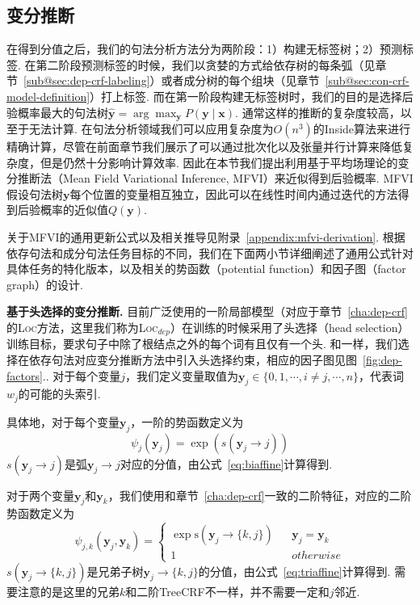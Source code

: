 \subsection{变分推断}

在得到分值之后，我们的句法分析方法分为两阶段：1）构建无标签树；2）预测标签.
在第二阶段预测标签的时候，我们以贪婪的方式给依存树的每条弧（见章节~\ref{sub@sec:dep-crf-labeling}）或者成分树的每个组块（见章节~\ref{sub@sec:con-crf-model-definition}）打上标签.
而在第一阶段构建无标签树时，我们的目的是选择后验概率最大的句法树$\hat{\boldsymbol{y}} = \arg\max_{\boldsymbol{y}} P(\boldsymbol{y}\mid \boldsymbol{x})$.
通常这样的推断的复杂度较高，以至于无法计算.
在句法分析领域我们可以应用复杂度为$O(n^3)$的Inside算法来进行精确计算，尽管在前面章节我们展示了可以通过批次化以及张量并行计算来降低复杂度，但是仍然十分影响计算效率.
因此在本节我们提出利用基于平均场理论的变分推断法（Mean Field Variational Inference, MFVI）来近似得到后验概率.
MFVI假设句法树$\boldsymbol{y}$每个位置的变量相互独立，因此可以在线性时间内通过迭代的方法得到后验概率的近似值$Q(\boldsymbol{y})$.

关于MFVI的通用更新公式以及相关推导见附录~\ref{appendix:mfvi-derivation}.
根据依存句法和成分句法任务目标的不同，我们在下面两小节详细阐述了通用公式针对具体任务的特化版本，以及相关的势函数（potential function）和因子图（factor graph）的设计.

\noindent\textbf{基于头选择的变分推断.}
目前广泛使用的一阶局部模型（对应于章节~\ref{cha:dep-crf}的\textsc{Loc}方法，这里我们称为\textsc{Loc}$_{dep}$）在训练的时候采用了头选择（head selection）训练目标，要求句子中除了根结点之外的每个词有且仅有一个头.
和\cite{wang-tu-2020-second}一样，我们选择在依存句法对应变分推断方法中引入头选择约束，相应的因子图见图~\ref{fig:dep-factors}..
对于每个变量$j$，我们定义变量取值为$\boldsymbol{y}_j\in \{0,1,\cdots,i\neq j,\cdots,n\}$，代表词$w_j$的可能的头索引.

具体地，对于每个变量$\boldsymbol{y}_j$，一阶的势函数定义为
\begin{equation}
  \label{eq:1o-potential}
  \psi_j(\boldsymbol{y}_j)=\exp(s(\boldsymbol{y}_j\rightarrow j))
\end{equation}
$s(\boldsymbol{y}_j\rightarrow j)$是弧$\boldsymbol{y}_j\rightarrow j$对应的分值，由公式~\ref{eq:biaffine}计算得到.

对于两个变量$\boldsymbol{y}_{j}$和$\boldsymbol{y}_{k}$，我们使用和章节~\ref{cha:dep-crf}一致的二阶特征，对应的二阶势函数定义为
\begin{equation}
  \label{eq:2o-dep-potential}
  \psi_{j,k}(\boldsymbol{y}_j,\boldsymbol{y}_k)=\left\{
  \begin{array}{rcl}
    \exp \mathrm{s}(\boldsymbol{y}_j\rightarrow \{k,j\}) &  & {\boldsymbol{y}_j=\boldsymbol{y}_k} \\
    1                                                    &  & {otherwise}
  \end{array}
  \right.
\end{equation}
$s(\boldsymbol{y}_j\rightarrow \{k,j\})$是兄弟子树$\boldsymbol{y}_j\rightarrow \{k,j\}$的分值，由公式~\ref{eq:triaffine}计算得到.
需要注意的是这里的兄弟$k$和二阶TreeCRF不一样，并不需要一定和$j$邻近.

